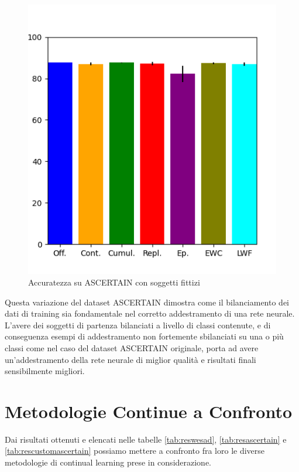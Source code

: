 \begin{figure}[!tbp]
\begin{minipage}[b]{0.5\textwidth}
		\includegraphics[width=\textwidth]{img/graphs/customascertain_final_accuracy.png}
		\caption{Accuratezza su ASCERTAIN con soggetti fittizi}
		\label{fig:customascertain_accuracy_graph}
	\end{minipage}
\end{figure}
Questa variazione del dataset ASCERTAIN dimostra come il bilanciamento dei dati di training sia fondamentale nel corretto addestramento di una rete neurale. L'avere dei soggetti di partenza bilanciati a livello di classi contenute, e di conseguenza esempi di addestramento non fortemente sbilanciati su una o più classi come nel caso del dataset ASCERTAIN originale, porta ad avere un'addestramento della rete neurale di miglior qualità e risultati finali sensibilmente migliori.
\section{Metodologie Continue a Confronto}
Dai risultati ottenuti e elencati nelle tabelle \ref{tab:reswesad}, \ref{tab:resascertain} e \ref{tab:rescustomascertain} possiamo mettere a confronto fra loro le diverse metodologie di continual learning prese in considerazione.

